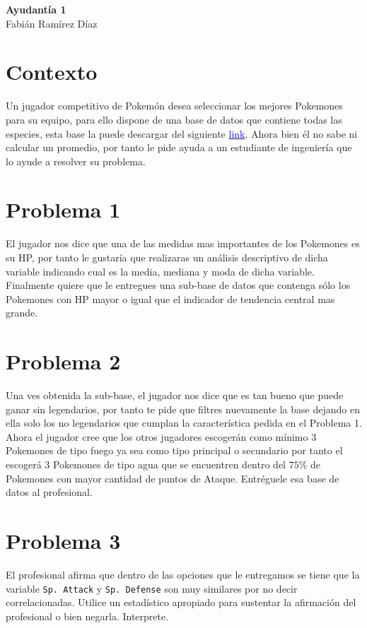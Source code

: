 \begin{center}
    \huge{
    \textbf{
        Ayudantía 1
    }
    }\\
    \normalsize{
        Fabián Ramírez Díaz
    }
\end{center}

\section*{Contexto}
Un jugador competitivo de Pokemón desea seleccionar los mejores Pokemones para su equipo, para ello dispone de una base de datos que contiene todas las especies, esta base la puede descargar del siguiente \href{https://fabimath.github.io/mat044/ay1/pokemon.csv}{\textcolor{blue}{link}}. Ahora bien él no sabe ni calcular un promedio, por tanto le pide ayuda a un estudiante de ingeniería que lo ayude a resolver su problema. 
\section*{Problema 1}
El jugador nos dice que una de las medidas mas importantes de los Pokemones es su HP, por tanto le gustaría que realizaras un análisis descriptivo de dicha variable indicando cual es la media, mediana y moda de dicha variable. Finalmente quiere que le entregues una sub-base de datos que contenga sólo los Pokemones con HP mayor o igual que el indicador de tendencia central mas grande.
\section*{Problema 2}
Una ves obtenida la sub-base, el jugador nos dice que es tan bueno que puede ganar sin legendarios, por tanto te pide que filtres nuevamente la base dejando en ella solo los no legendarios que cumplan la característica pedida en el Problema 1. Ahora el jugador cree que los otros jugadores escogerán como mínimo 3 Pokemones de tipo fuego ya sea como tipo principal o secundario por tanto el escogerá 3 Pokemones de tipo agua que se encuentren dentro del $75\%$ de Pokemones con mayor cantidad de puntos de Ataque. Entréguele         esa base de datos al profesional.
\section*{Problema 3}
El profesional afirma que dentro de las opciones que le entregamos se tiene que la variable \texttt{Sp. Attack} y \texttt{Sp. 	Defense} son muy similares por no decir correlacionadas. Utilice un estadístico apropiado para sustentar la afirmación del profesional o bien negarla. Interprete.

